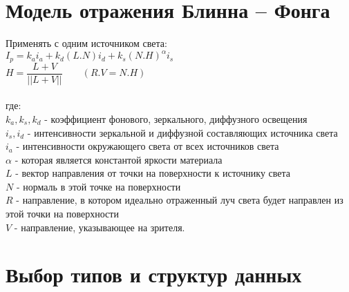 

\section{Модель отражения Блинна – Фонга}

Применять с одним источником света:\\

$
\displaystyle I_p = k_ai_a + k_d(L.N)i_d + k_s(N.H)^\alpha i_s
$\\

$
H = \dfrac{L + V}{||L + V||} \qquad (R.V = N.H)
$
\\\\
где:\\
$k_a, k_s, k_d$ - коэффициент фонового, зеркального, диффузного освещения\\
$i_s, i_d$ - интенсивности зеркальной и диффузной составляющих источника света\\
$i_a$ - интенсивности окружающего света от всех источников света\\
$\alpha$ - которая является константой яркости материала\\
$L$ - вектор направления от точки на поверхности к источнику света\\
$N$ - нормаль в этой точке на поверхности\\
$R$ - направление, в котором идеально отраженный луч света будет направлен из этой точки на поверхности\\
$V$ - направление, указывающее на зрителя.


\section{Выбор типов и структур данных}


